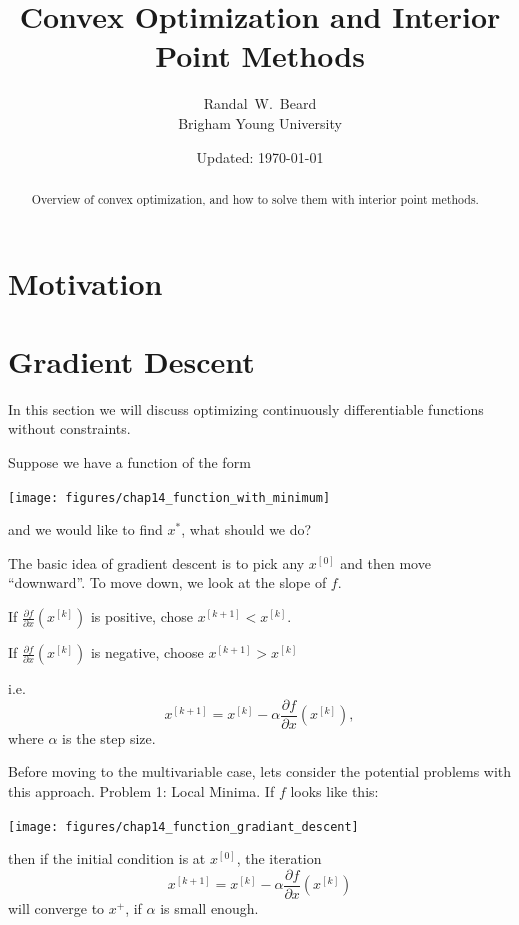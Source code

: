 \documentclass{article}
\title{\LARGE \bf
Convex Optimization and Interior Point Methods
}
\date{Updated: \today}
\author{Randal~W.~Beard \\ Brigham Young University}
\begin{document}
\maketitle

\begin{abstract}
Overview of convex optimization, and how to solve them with interior point methods.  
\end{abstract}

\section{Motivation}

\section{Gradient Descent}


	In this section we will discuss optimizing continuously differentiable functions without constraints.

	Suppose we have a function of the form
	\begin{center}
		\texttt{[image: figures/chap14\_function\_with\_minimum]}
	\end{center}
	and we would like to find $x^{\ast}$, what should we do?


	The basic idea of gradient descent is to pick any $x^{[0]}$ and then move ``downward''.  To move down, we look at the slope of $f$.
	
	If $\frac{\partial f}{\partial x}(x^{[k]})$ is positive, chose $x^{[k+1]} < x^{[k]}$.
	
	If $\frac{\partial f}{\partial x}(x^{[k]})$ is negative, choose $x^{[k+1]} > x^{[k]}$
	
	i.e.
	\[ 
		x^{[k+1]} = x^{[k]} - \alpha \frac{\partial f}{\partial x}(x^{[k]}),
	\]
	where $\alpha$ is the step size.	

	Before moving to the multivariable case, lets consider the potential problems with this approach.		
	{\color{blue}Problem 1: Local Minima.}
	If $f$ looks like this:
	\begin{center}
		\texttt{[image: figures/chap14\_function\_gradiant\_descent]}
	\end{center}
	then if the initial condition is at $x^{[0]}$, the iteration 
	\[
		x^{[k+1]} = x^{[k]} - \alpha \frac{\partial f}{\partial x}(x^{[k]})
	\] 
	will converge to $x^+$, if $\alpha$ is small enough.
\end{document}
